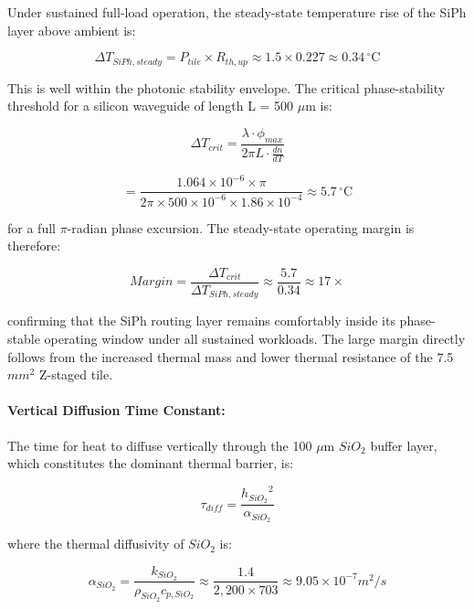 \documentclass[journal]{IEEEtran}
\begin{document}
Under sustained full-load operation, the steady-state temperature rise of the SiPh layer above ambient is:

\begin{equation}
\Delta T_{SiPh,steady} = P_{tile} \times R_{th,up} \approx 1.5 \times 0.227 \approx 0.34 \,^{\circ}\mathrm{C}
\end{equation}

This is well within the photonic stability envelope. The critical phase-stability threshold for a silicon waveguide of length L = 500 $\mu$m is:

\begin{equation}
\Delta T_{crit} = \frac{\lambda \cdot \phi_{max}}{2\pi L \cdot \frac{dn}{dT}}
\end{equation}

\begin{equation}
= \frac{1.064 \times 10^{-6} \times \pi}{2\pi \times 500 \times 10^{-6} \times 1.86 \times 10^{-4}} \approx 5.7 \,^{\circ}\mathrm{C}
\end{equation}

for a full $\pi$-radian phase excursion. The steady-state operating margin is therefore:

\begin{equation}
Margin = \frac {\Delta T_{crit}}{\Delta T_{SiPh,steady}}
\approx \frac {5.7}{0.34} \approx 17\times
\end{equation}

confirming that the SiPh routing layer remains comfortably inside its phase-stable operating window under all sustained workloads. The large margin directly follows from the increased thermal mass and lower thermal resistance of the 7.5 $mm^{2}$ Z-staged tile.

\paragraph{\textbf{Vertical Diffusion Time Constant:}}

The time for heat to diffuse vertically through the 100 $\mu$m $SiO_2$ buffer layer, which constitutes the dominant thermal barrier, is:

\begin{equation}
\tau_{diff} = \frac {{h_{SiO_2}}^{2}}{\alpha_{SiO_2}}
\end{equation}

where the thermal diffusivity of $SiO_2$ is:

\begin{equation}
\alpha_{SiO_2} = \frac{k_{SiO_2}}{\rho_{SiO_2} c_{p,SiO_2}}
\approx \frac{1.4}{2,200 \times 703} \approx 9.05 \times 10^{-7} m^{2}/s
\end{equation}
\end{document}
